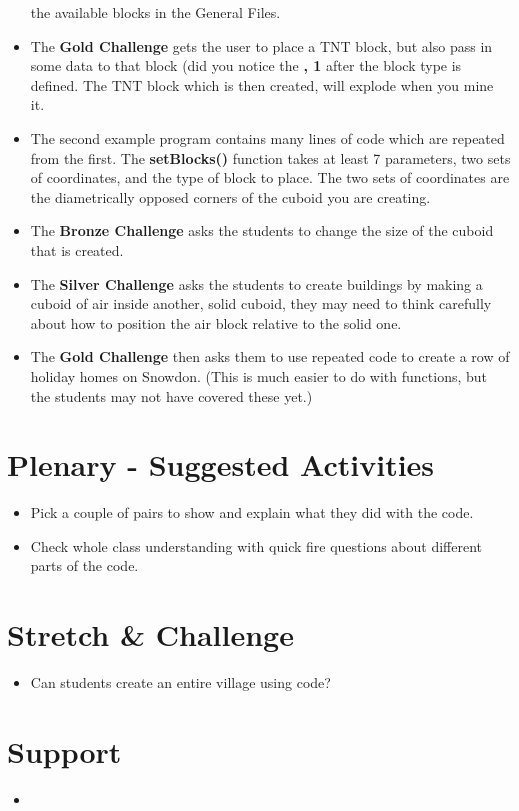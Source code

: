 \documentclass{geocraft-lesson-plan}
\begin{document}
\begin{itemize}
  the available blocks in the General Files.
\item The \textbf{Gold Challenge} gets the user to place a TNT block, but also pass in some data to that block (did you
  notice the \textbf{, 1} after the block type is defined. The TNT block which is then created, will explode when you
  mine it.
\item The second example program contains many lines of code which are repeated from the first. The \textbf{setBlocks()}
  function takes at least 7 parameters, two sets of coordinates, and the type of block to place. The two sets of
  coordinates are the diametrically opposed corners of the cuboid you are creating.
\item The \textbf{Bronze Challenge} asks the students to change the size of the cuboid that is created.
\item The \textbf{Silver Challenge} asks the students to create buildings by making a cuboid of air inside another,
  solid cuboid, they may need to think carefully about how to position the air block relative to the solid one.
\item The \textbf{Gold Challenge} then asks them to use repeated code to create a row of holiday homes on Snowdon. (This
  is much easier to do with functions, but the students may not have covered these yet.)
\end{itemize}

\section*{Plenary - Suggested Activities}
\begin{itemize}
\item Pick a couple of pairs to show and explain what they did with the code. 
\item Check whole class understanding with quick fire questions about different parts of the code. 
\end{itemize}


\section*{Stretch \& Challenge}
\begin{itemize}
\item Can students create an entire village using code?
\end{itemize}

\section*{Support}
\begin{itemize}
\item 
\end{itemize}
\end{document}
